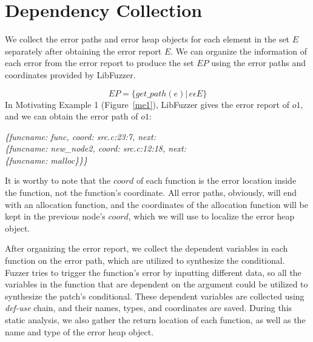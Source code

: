 \documentclass[a4paper,11pt,oneside,openany]{book}
\begin{document}
\section{Dependency Collection}


We collect the error paths and error heap objects for each element in the set $E$ separately after obtaining the error report $E$. We can organize the information of each error from the error report to produce the set $EP$ using the error paths and coordinates provided by LibFuzzer. 


\begin{equation}
EP=\{get\_path(e)|\, e \epsilon E\}
\end{equation}
In Motivating Example 1 (Figure~\ref{me1}), LibFuzzer gives the error report of $o1$, and we can obtain the error path of $o1$:


\begin{minipage}{\textwidth}
\vspace{0.2cm}
\textsl{\hspace{0.3cm}\{funcname: func, coord: src.c:23:7, next:\\\hspace{0.6cm}\{funcname: new\_node2, coord: src.c:12:18, next:\\\hspace{0.9cm}\{funcname: malloc\}\}\}}
\vspace{0.2cm}
\end{minipage}
It is worthy to note that the $coord$ of each function is the error location inside the function, not the function's coordinate. All error paths, obviously, will end with an allocation function, and the coordinates of the allocation function will be kept in the previous node's $coord$, which we will use to localize the error heap object.


After organizing the error report, we collect the dependent variables in each function on the error path, which are utilized to synthesize the conditional. Fuzzer tries to trigger the function's error by inputting different data, so all the variables in the function that are dependent on the argument could be utilized to synthesize the patch's conditional. These dependent variables are collected using {\it def-use} chain, and their names, types, and coordinates are saved. During this static analysis, we also gather the return location of each function, as well as the name and type of the error heap object.
\end{document}
